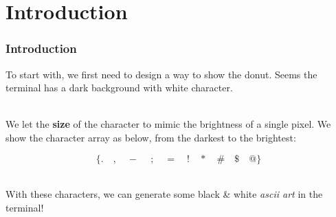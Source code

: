 \documentclass[12pt, t]{beamer}
\renewcommand{\emph}[1]{{\color{Turquoise3}\textsl{#1}}}
\newcommand{\nullspace}{~\\[15pt]}
\begin{document}

\section{Introduction}
\begin{frame}
    \frametitle{Introduction}

    To start with, we first need to design a way to show the donut. Seems the terminal has a dark 
    background with white character.
    
    \nullspace
    We let the \textbf{size} of the character to mimic the brightness of a single pixel. We show 
    the character array as below, from the darkest to the brightest:

    \begin{equation*}
        \{.\quad ,\quad -~\quad ;\quad =\quad !\quad *\quad \#\quad \$\quad @\}
    \end{equation*}

    \nullspace
    With these characters, we can generate some black \& white \emph{ascii art} in the terminal!

\end{frame}

\end{document}
